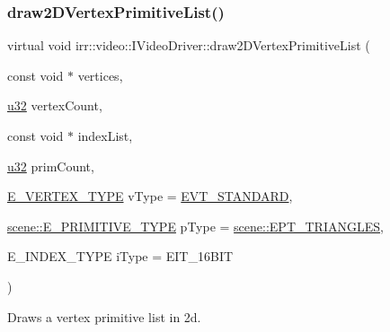 \subsubsection{\texorpdfstring{draw2\+D\+Vertex\+Primitive\+List()}{draw2DVertexPrimitiveList()}\hspace{0.1cm}{\footnotesize\ttfamily [2/2]}}
{\footnotesize\ttfamily virtual void irr\+::video\+::\+I\+Video\+Driver\+::draw2\+D\+Vertex\+Primitive\+List (\begin{DoxyParamCaption}\item[{const void $\ast$}]{vertices,  }\item[{\hyperlink{namespaceirr_a0416a53257075833e7002efd0a18e804}{u32}}]{vertex\+Count,  }\item[{const void $\ast$}]{index\+List,  }\item[{\hyperlink{namespaceirr_a0416a53257075833e7002efd0a18e804}{u32}}]{prim\+Count,  }\item[{\hyperlink{namespaceirr_1_1video_a0e3b59e025e0d0db0ed2ee0ce904deac}{E\+\_\+\+V\+E\+R\+T\+E\+X\+\_\+\+T\+Y\+PE}}]{v\+Type = {\ttfamily \hyperlink{namespaceirr_1_1video_a0e3b59e025e0d0db0ed2ee0ce904deaca921f287a4f48d612a5be2d89453ca262}{E\+V\+T\+\_\+\+S\+T\+A\+N\+D\+A\+RD}},  }\item[{\hyperlink{namespaceirr_1_1scene_a5d7de82f2169761194b2f44d95cdc1dc}{scene\+::\+E\+\_\+\+P\+R\+I\+M\+I\+T\+I\+V\+E\+\_\+\+T\+Y\+PE}}]{p\+Type = {\ttfamily \hyperlink{namespaceirr_1_1scene_a5d7de82f2169761194b2f44d95cdc1dca6c884c4de3210b3ed36c99fb828ce376}{scene\+::\+E\+P\+T\+\_\+\+T\+R\+I\+A\+N\+G\+L\+ES}},  }\item[{E\+\_\+\+I\+N\+D\+E\+X\+\_\+\+T\+Y\+PE}]{i\+Type = {\ttfamily EIT\+\_\+16BIT} }\end{DoxyParamCaption})\hspace{0.3cm}{\ttfamily [pure virtual]}}



Draws a vertex primitive list in 2d. 

